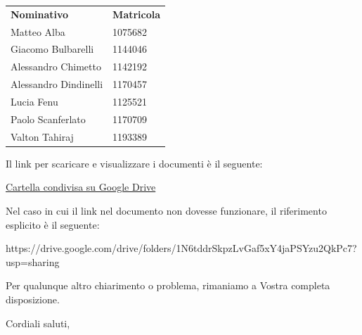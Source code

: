\documentclass[12pt]{letter}
\begin{document}
\begin{letter}{ }
\begin{center}
   \centering
   \begin{tabular}{ll}
     \textbf{Nominativo}        & \textbf{Matricola} \\
     Matteo Alba                     &  1075682 \\
	 Giacomo Bulbarelli              &  1144046 \\
	 Alessandro Chimetto             &  1142192 \\     
	 Alessandro Dindinelli           &  1170457 \\	     
	 Lucia Fenu                      &  1125521 \\
     Paolo Scanferlato               &  1170709 \\
     Valton Tahiraj                  &  1193389 \\
   \end{tabular}
 \end{center}

Il link per scaricare e visualizzare i documenti è il seguente:

\begin{center}
\href{https://drive.google.com/drive/folders/1N6tddrSkpzLvGaf5xY4jaPSYzu2QkPc7?usp=sharing}{Cartella condivisa su Google Drive}
\end{center}

Nel caso in cui il link nel documento non dovesse funzionare, il riferimento esplicito è il seguente:
\begin{center}
https://drive.google.com/drive/folders/1N6tddrSkpzLvGaf5xY4jaPSYzu2QkPc7?usp=sharing
\end{center}


Per qualunque altro chiarimento o problema, rimaniamo a Vostra completa disposizione.

\closing{Cordiali saluti,}


\vspace{3em}

\end{letter}
\end{document}
